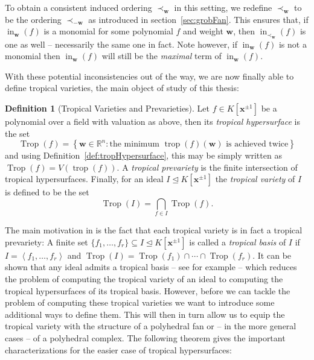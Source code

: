 \documentclass[
  paper=a4,
  titlepage,
  bibliography=totoc,
  listof=totoc,
  pagesize=pdftex
]{scrartcl}
\numberwithin{figure}{section}
\numberwithin{equation}{section}
\numberwithin{table}{section}
\newcommand*\setR{\mathds{R}}
\newcommand*\ideal[1]{\left\langle #1 \right\rangle}
\let\vec\mathbf
\let\idealof\trianglelefteq
\DeclareMathOperator{\Trop}{Trop}
\DeclareMathOperator{\trop}{trop}
\DeclareMathOperator{\initial}{in}
\theoremstyle{definition}
\newtheorem{definition}{Definition}
\numberwithin{definition}{section}
\begin{document}
To obtain a consistent induced ordering $\prec_{\vec w}$ in this setting, we redefine
$\prec_{\vec w}$ to be the ordering $\prec_{-\vec w}$ as introduced in
section~\ref{sec:grobFan}. This ensures that, if $\initial_{\vec w}(f)$ is a monomial for
some polynomial $f$ and weight $\vec w$, then $\initial_{\prec_{\vec w}}(f)$ is one as
well -- necessarily the same one in fact. Note however, if $\initial_{\vec w}(f)$ is not a
monomial then $\initial_{\vec w}(f)$ will still be the \emph{maximal} term of
$\initial_{\vec w}(f)$.

With these potential inconsistencies out of the way, we are now finally able to define
tropical varieties, the main object of study of this thesis:

\begin{definition}[Tropical Varieties and Prevarieties]
  \label{def:tropicalVariety}
  Let $f \in K[\vec x^{\pm1}]$ be a polynomial over a field with valuation as above, then
  its \emph{tropical hypersurface} is the set
  \[
    \Trop(f) = \left\{
      \vec w \in \setR^n :
      \text{the minimum $\trop(f)(\vec w)$ is achieved twice}
    \right\}
  \]
  and using Definition~\ref{def:tropHypersurface}, this may be simply written as $\Trop(f)
  = V(\trop(f))$. A \emph{tropical prevariety} is the finite intersection of tropical
  hypersurfaces. Finally, for an ideal $I \idealof K[\vec x^{\pm1}]$ the \emph{tropical
  variety} of $I$ is defined to be the set
  \[
    \Trop(I) = \bigcap_{f \in I} \Trop(f).
  \]
\end{definition}

The main motivation in \cite{compTropVar} is the fact that each tropical variety is in
fact a tropical prevariety: A finite set $\{ f_1, \dots, f_r \} \subseteq I \idealof
K[\vec x^{\pm1}]$ is called a \emph{tropical basis} of $I$ if $I = \ideal{f_1, \dots,
f_r}$ and $\Trop(I) = \Trop(f_1) \cap \cdots \cap \Trop(f_r)$. It can be shown that any
ideal admits a tropical basis -- see for example \cite[Theorem~2.9]{compTropVar} -- which
reduces the problem of computing the tropical variety of an ideal to computing the
tropical hypersurfaces of its tropical basis. However, before we can tackle the problem of
computing these tropical varieties we want to introduce some additional ways to define
them. This will then in turn allow us to equip the tropical variety with the structure of
a polyhedral fan or -- in the more general cases -- of a polyhedral complex. The
following theorem gives the important characterizations for the easier case of tropical
hypersurfaces:
\end{document}
